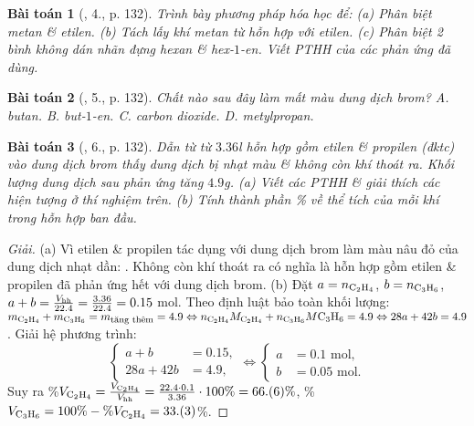 \documentclass{article}
\newtheorem{baitoan}{Bài toán}
\begin{document}
\begin{baitoan}[\cite{SGK_Hoa_Hoc_11_co_ban}, 4., p. 132]
	Trình bày phương pháp hóa học để: (a) Phân biệt metan \& etilen. (b) Tách lấy khí metan từ hỗn hợp với etilen. (c) Phân biệt 2 bình không dán nhãn đựng hexan \& hex-$1$-en. Viết PTHH của các phản ứng đã dùng.
\end{baitoan}

\begin{baitoan}[\cite{SGK_Hoa_Hoc_11_co_ban}, 5., p. 132]
	Chất nào sau đây làm mất màu dung dịch brom? {\sf A.} butan. {\sf B.} but-$1$-en. {\sf C.} carbon dioxide. {\sf D.} metylpropan.
\end{baitoan}

\begin{baitoan}[\cite{SGK_Hoa_Hoc_11_co_ban}, 6., p. 132]
	Dẫn từ từ $3.36$\emph{l} hỗn hợp gồm etilen \& propilen (đktc) vào dung dịch brom thấy dung dịch bị nhạt màu \& không còn khí thoát ra. Khối lượng dung dịch sau phản ứng tăng $4.9$\emph{g}. (a) Viết các PTHH \& giải thích các hiện tượng ở thí nghiệm trên. (b) Tính thành phần \% về thể tích của mỗi khí trong hỗn hợp ban đầu.
\end{baitoan}

\begin{proof}[Giải]
	(a) Vì etilen \& propilen tác dụng với dung dịch brom làm màu nâu đỏ của dung dịch nhạt dần: . Không còn khí thoát ra có nghĩa là hỗn hợp gồm etilen \& propilen đã phản ứng hết với dung dịch brom. (b) Đặt $a = n_{\ce{C2H4}}$, $b = n_{\ce{C3H6}}$, $a + b = \frac{V_{\rm hh}}{22.4} = \frac{3.36}{22.4} = 0.15$ mol. Theo định luật bảo toàn khối lượng: $m_{\ce{C2H4}} + m_{\ce{C3H6}} = m_{\footnotesize\mbox{tăng thêm}} = 4.9\Leftrightarrow n_{\ce{C2H4}}M_{\ce{C2H4}} + n_{\ce{C3H6}}M{\ce{C3H6}} = 4.9\Leftrightarrow28a + 42b = 4.9$. Giải hệ phương trình:
	\begin{equation*}
		\left\{\begin{split}
			a + b &= 0.15,\\
			28a + 42b &= 4.9,
		\end{split}\right.\Leftrightarrow\left\{\begin{split}
			a &= 0.1\mbox{ mol},\\
			b &= 0.05\mbox{ mol}.
	\end{split}\right.
	\end{equation*}
	Suy ra \%$V_{\ce{C2H4}} = \frac{V_{\ce{C2H4}}}{V_{\rm hh}} = \frac{22.4\cdot0.1}{3.36}\cdot100\% = 66.(6)\%$, \%$V_{\ce{C3H6}} = 100\% - \%V_{\ce{C2H4}} = 33.(3)$\%.
\end{proof}
\end{document}
